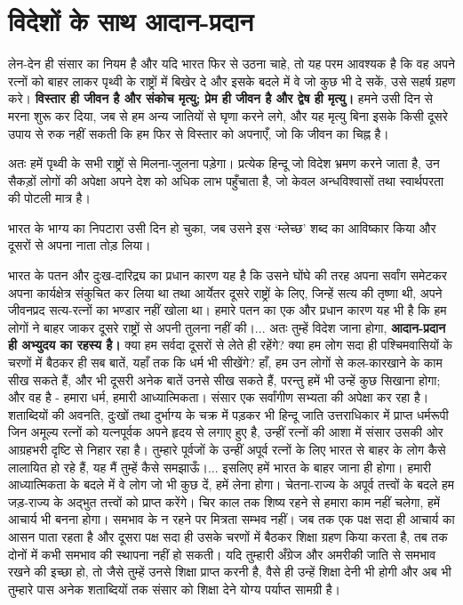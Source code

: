 \section*{विदेशों के साथ आदान-प्रदान}


लेन-देन ही संसार का नियम है और यदि भारत फिर से उठना चाहे, तो यह परम आवश्यक है कि वह अपने रत्नों को बाहर लाकर पृथ्वी के राष्ट्रों में बिखेर दे और इसके बदले में वे जो कुछ भी दे सकें, उसे सहर्ष ग्रहण करे। \textbf{विस्तार ही जीवन है और संकोच मृत्यु; प्रेम ही जीवन है और द्वेष ही मृत्यु। } हमने उसी दिन से मरना शुरू कर दिया, जब से हम अन्य जातियों से घृणा करने लगे, और यह मृत्यु बिना इसके किसी दूसरे उपाय से रुक नहीं सकती कि हम फिर से विस्तार को अपनाएँ, जो कि जीवन का चिह्न है। 

अतः हमें पृथ्वी के सभी राष्ट्रों से मिलना-जुलना पड़ेगा। प्रत्येक हिन्दू जो विदेश भ्रमण करने जाता है, उन सैकड़ों लोगों की अपेक्षा अपने देश को अधिक लाभ पहुँचाता है, जो केवल अन्धविश्वासों तथा स्वार्थपरता की पोटली मात्र है। 

भारत के भाग्य का निपटारा उसी दिन हो चुका, जब उसने इस ‘म्लेच्छ’ शब्द का आविष्कार किया और दूसरों से अपना नाता तोड़ लिया। 

भारत के पतन और दुःख-दारिद्र्य का प्रधान कारण यह है कि उसने घोंघे की तरह अपना सर्वांग समेटकर अपना कार्यक्षेत्र संकुचित कर लिया था तथा आर्येतर दूसरे राष्ट्रों के लिए, जिन्हें सत्य की तृष्णा थी, अपने जीवनप्रद सत्य-रत्नों का भण्डार नहीं खोला था। हमारे पतन का एक और प्रधान कारण यह भी है कि हम लोगों ने बाहर जाकर दूसरे राष्ट्रों से अपनी तुलना नहीं की।... अतः तुम्हें विदेश जाना होगा, \textbf{आदान-प्रदान ही अभ्युदय का रहस्य है। } क्या हम सर्वदा दूसरों से लेते ही रहेंगे? क्या हम लोग सदा ही पश्चिमवासियों के चरणों में बैठकर ही सब बातें, यहाँ तक कि धर्म भी सीखेंगे? हाँ, हम उन लोगों से कल-कारखाने के काम सीख सकते हैं, और भी दूसरी अनेक बातें उनसे सीख सकते हैं, परन्तु हमें भी उन्हें कुछ सिखाना होगा; और वह है - हमारा धर्म, हमारी आध्यात्मिकता। संसार एक सर्वांगीण सभ्यता की अपेक्षा कर रहा है। शताब्दियों की अवनति, दुःखों तथा दुर्भाग्य के चक्र में पड़कर भी हिन्दू जाति उत्तराधिकार में प्राप्त धर्मरूपी जिन अमूल्य रत्नों को यत्नपूर्वक अपने हृदय से लगाए हुए है, उन्हीं रत्नों की आशा में संसार उसकी ओर आग्रहभरी दृष्टि से निहार रहा है। तुम्हारे पूर्वजों के उन्हीं अपूर्व रत्नों के लिए भारत से बाहर के लोग कैसे लालायित हो रहे हैं, यह मैं तुम्हें कैसे समझाऊँ।... इसलिए हमें भारत के बाहर जाना ही होगा। हमारी आध्यात्मिकता के बदले में वे लोग जो भी कुछ दें, हमें लेना होगा। चेतना-राज्य के अपूर्व तत्त्वों के बदले हम जड़-राज्य के अद्भुत तत्त्वों को प्राप्त करेंगे। चिर काल तक शिष्य रहने से हमारा काम नहीं चलेगा, हमें आचार्य भी बनना होगा। समभाव के न रहने पर मित्रता सम्भव नहीं। जब तक एक पक्ष सदा ही आचार्य का आसन पाता रहता है और दूसरा पक्ष सदा ही उसके चरणों में बैठकर शिक्षा ग्रहण किया करता है, तब तक दोनों में कभी समभाव की स्थापना नहीं हो सकती। यदि तुम्हारी अँग्रेज और अमरीकी जाति से समभाव रखने की इच्छा हो, तो जैसे तुम्हें उनसे शिक्षा प्राप्त करनी है, वैसे ही उन्हें शिक्षा देनी भी होगी और अब भी तुम्हारे पास अनेक शताब्दियों तक संसार को शिक्षा देने योग्य पर्याप्त सामग्री है। 

